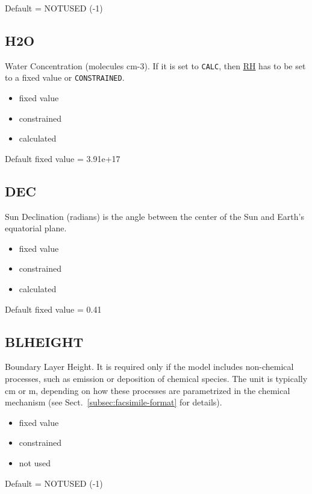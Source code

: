 Default = NOTUSED (-1)

\subsection{H2O} \label{subsec:h2o}

Water Concentration (molecules cm-3). If it is set to \texttt{CALC},
then \hyperref[subsec:rh]{RH} has to be set to a fixed value or
\texttt{CONSTRAINED}.

\begin{itemize}
\item fixed value
\item constrained
\item calculated
\end{itemize}

Default fixed value = 3.91e+17

\subsection{DEC} \label{subsec:dec}

Sun Declination (radians) is the angle between the center of the Sun
and Earth's equatorial plane.

\begin{itemize}
\item fixed value
\item constrained
\item calculated
\end{itemize}

Default fixed value = 0.41

\subsection{BLHEIGHT} \label{subsec:blheight}

Boundary Layer Height. It is required only if the model includes
non-chemical processes, such as emission or deposition of chemical
species. The unit is typically cm or m, depending on how these
processes are parametrized in the chemical mechanism (see
Sect.~\ref{subsec:facsimile-format} for details).

\begin{itemize}
\item fixed value
\item constrained
\item not used
\end{itemize}

Default = NOTUSED (-1)

